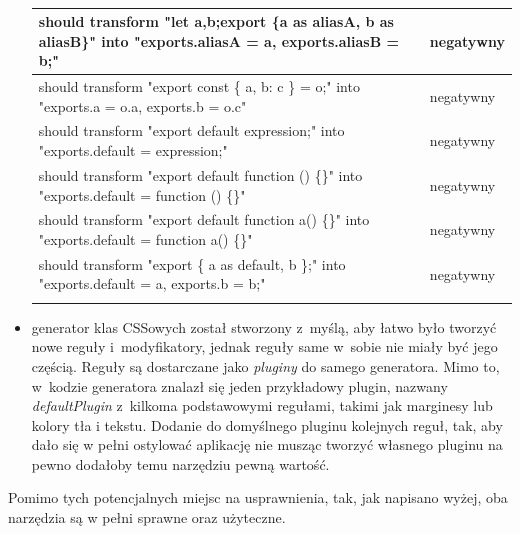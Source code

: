 \documentclass{SGGW-thesis}
\begin{document}
\begin{itemize}
\begin{longtable}{|p{13cm}|p{2cm}|}
            should transform "let a,b;export \{a as aliasA, b as aliasB\}" into "exports.aliasA = a, exports.aliasB = b;"                                                    & negatywny            \\ \hline
            should transform "export const \{ a, b: c \} = o;" into "exports.a = o.a, exports.b = o.c"                                                                       & negatywny            \\ \hline
            should transform "export default expression;" into "exports.default = expression;"                                                                               & negatywny            \\ \hline
            should transform "export default function () \{\}" into "exports.default = function () \{\}"                                                                     & negatywny            \\ \hline
            should transform "export default function a() \{\}" into "exports.default = function a() \{\}"                                                                   & negatywny            \\ \hline
            should transform "export \{ a as default, b \};" into "exports.default = a, exports.b = b;"                                                                      & negatywny            \\ \hline
            \caption{}
            \label{tab:my-table}\\
            \end{longtable}
    \item generator klas CSSowych został stworzony z~myślą, aby łatwo było tworzyć nowe reguły i~modyfikatory, jednak reguły same w~sobie nie miały być jego częścią. Reguły są dostarczane jako \emph{pluginy} do samego generatora. Mimo to, w~kodzie generatora znalazł się jeden przykładowy plugin, nazwany \emph{defaultPlugin} z~kilkoma podstawowymi regułami, takimi jak marginesy lub kolory tła i tekstu. Dodanie do domyślnego pluginu kolejnych reguł, tak, aby dało się w pełni ostylować aplikację nie musząc tworzyć własnego pluginu na pewno dodałoby temu narzędziu pewną wartość.
\end{itemize}

Pomimo tych potencjalnych miejsc na usprawnienia, tak, jak napisano wyżej, oba narzędzia są w pełni sprawne oraz użyteczne.
\end{document}

